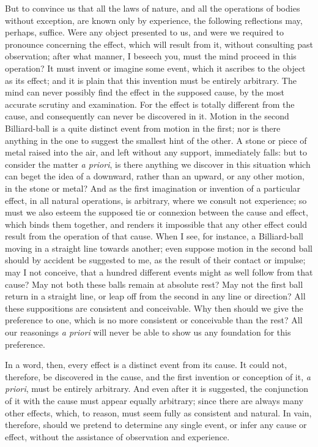 \documentclass[]{article}
\begin{document}
\begin{sectionbody}
\humeparagraph  But to convince us that all the laws of nature, and all the operations of bodies without exception, are known only by experience, the following reflections may, perhaps, suffice. Were any object presented to us, and were we required to pronounce concerning the effect, which will result from it, without consulting past observation; after what manner, I beseech you, must the mind proceed in this operation? It must invent or imagine some event, which it ascribes to the object as its effect; and it is plain that this invention must be entirely arbitrary. The mind can never possibly find the effect in the supposed cause, by the most accurate scrutiny and examination. For the effect is totally different from the cause, and consequently can never be discovered in it. Motion in the second Billiard-ball is a quite distinct event from motion in the first; nor is there anything in the one to suggest the smallest hint of the other. A stone or piece of metal raised into the air, and left without any support, immediately falls: but to consider the matter \emph{a priori}, is there anything we discover in this situation which can beget the idea of a downward, rather than an upward, or any other motion, in the stone or metal? And as the first imagination or invention of a particular effect, in all natural operations, is arbitrary, where we consult not experience; so must we also esteem the supposed tie or connexion between the cause and effect, which binds them together, and renders it impossible that any other effect could result from the operation of that cause. When I see, for instance, a Billiard-ball moving in a straight line towards another; even suppose motion in the second ball should by accident be suggested to me, as the result of their contact or impulse; may I not conceive, that a hundred different events might as well follow from that cause? May not both these balls remain at absolute rest? May not the first ball return in a straight line, or leap off from the second in any line or direction? All these suppositions are consistent and conceivable. Why then should we give the preference to one, which is no more consistent or conceivable than the rest? All our reasonings \emph{a priori} will never be able to show us any foundation for this preference.

\humeparagraph  In a word, then, every effect is a distinct event from its cause. It could not, therefore, be discovered in the cause, and the first invention or conception of it, \emph{a priori}, must be entirely arbitrary. And even after it is suggested, the conjunction of it with the cause must appear equally arbitrary; since there are always many other effects, which, to reason, must seem fully as consistent and natural. In vain, therefore, should we pretend to determine any single event, or infer any cause or effect, without the assistance of observation and experience.


\end{sectionbody}
\end{document}
